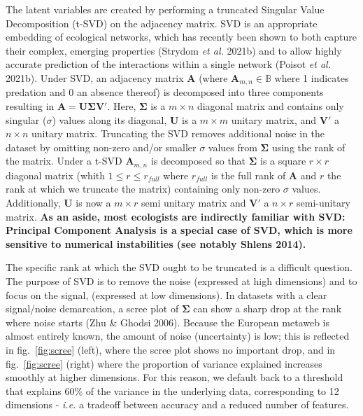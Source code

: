 \documentclass[11pt]{article}
\makeatletter
\def\maxwidth{\ifdim\Gin@nat@width>\linewidth\linewidth
\else\Gin@nat@width\fi}
\let\Oldincludegraphics\includegraphics
\renewcommand{\includegraphics}[1]{\Oldincludegraphics[width=\maxwidth]{#1}}
\providecommand{\DIFaddtex}[1]{{\bf #1}} %
\providecommand{\DIFdeltex}[1]{} %
\providecommand{\DIFaddbegin}{\protect\color{blue}} %
\providecommand{\DIFaddend}{\protect\color{black}} %
\providecommand{\DIFdelbegin}{\protect\color{red}} %
\providecommand{\DIFdelend}{\protect\color{black}} %
\providecommand{\DIFadd}[1]{\texorpdfstring{\DIFaddtex{#1}}{#1}} %
\providecommand{\DIFdel}[1]{\texorpdfstring{\DIFdeltex{#1}}{}} %
\newcommand{\DIFscaledelfig}{0.5}
\newlength{\DIFdelgraphicswidth} %
\newlength{\DIFdelgraphicsheight} %
\newcommand{\DIFaddincludegraphics}[2][]{{\color{blue}\fbox{\DIFOincludegraphics[#1]{#2}}}} %
\newcommand{\DIFdelincludegraphics}[2][]{%
\sbox{\DIFdelgraphicsbox}{\DIFOincludegraphics[#1]{#2}}%
\settoboxwidth{\DIFdelgraphicswidth}{\DIFdelgraphicsbox} %
\settoboxtotalheight{\DIFdelgraphicsheight}{\DIFdelgraphicsbox} %
\scalebox{\DIFscaledelfig}{%
\parbox[b]{\DIFdelgraphicswidth}{\usebox{\DIFdelgraphicsbox}\\[-\baselineskip] \rule{\DIFdelgraphicswidth}{0em}}\llap{\resizebox{\DIFdelgraphicswidth}{\DIFdelgraphicsheight}{%
\setlength{\unitlength}{\DIFdelgraphicswidth}%
\begin{picture}(1,1)%
\thicklines\linethickness{2pt} %
{\color[rgb]{1,0,0}\put(0,0){\framebox(1,1){}}}%
{\color[rgb]{1,0,0}\put(0,0){\line( 1,1){1}}}%
{\color[rgb]{1,0,0}\put(0,1){\line(1,-1){1}}}%
\end{picture}%
}\hspace*{3pt}}} %
} %
\DeclareRobustCommand{\DIFaddbegin}{\DIFOaddbegin \let\includegraphics\DIFaddincludegraphics} %
\DeclareRobustCommand{\DIFaddend}{\DIFOaddend \let\includegraphics\DIFOincludegraphics} %
\DeclareRobustCommand{\DIFdelbegin}{\DIFOdelbegin \let\includegraphics\DIFdelincludegraphics} %
\DeclareRobustCommand{\DIFdelend}{\DIFOaddend \let\includegraphics\DIFOincludegraphics} %
\makeatother
\begin{document}
The latent variables are created by performing a truncated Singular
Value Decomposition (t-SVD) on the adjacency matrix. SVD is an
appropriate embedding of ecological networks, which has recently been
shown to both capture their complex, emerging properties (Strydom
\emph{et al.} 2021b) and to allow highly accurate prediction of the
interactions within a single network (Poisot \emph{et al.} 2021b). Under
SVD, an adjacency matrix \(\mathbf{A}\) (where
\(\mathbf{A}_{m,n}\in\mathbb{B}\) where 1 indicates predation and 0 an
absence thereof) is decomposed into three components resulting in
\DIFdelbegin \DIFdel{\(\mathbf{A} = \mathbf{L}\mathbf{\Sigma}\mathbf{R'}.\) }\DIFdelend \DIFaddbegin \DIFadd{\(\mathbf{A} = \mathbf{U}\mathbf{\Sigma}\mathbf{V'}.\) }\DIFaddend Here,
\(\mathbf{\Sigma}\) is a \(m \times n\) diagonal matrix and contains
only singular (\(\sigma\)) values along its diagonal, \DIFdelbegin \DIFdel{\(\mathbf{L}\) }\DIFdelend \DIFaddbegin \DIFadd{\(\mathbf{U}\) }\DIFaddend is
a \(m \times m\) unitary matrix, and \DIFdelbegin \DIFdel{\(\mathbf{R}'\) }\DIFdelend \DIFaddbegin \DIFadd{\(\mathbf{V}'\) }\DIFaddend a \(n \times n\)
unitary matrix. Truncating the SVD removes additional noise in the
dataset by omitting non-zero and/or smaller \(\sigma\) values from
\(\mathbf{\Sigma}\) using the rank of the matrix. Under a t-SVD
\(\mathbf{A}_{m,n}\) is decomposed so that \(\mathbf{\Sigma}\) is a
square \(r \times r\) diagonal matrix (whith \(1 \le r \le r_{full}\)
where \(r_{full}\) is the full rank of \(\mathbf{A}\) and \(r\) the rank
at which we truncate the matrix) containing only non-zero \(\sigma\)
values. Additionally, \DIFdelbegin \DIFdel{\(\mathbf{L}\) }\DIFdelend \DIFaddbegin \DIFadd{\(\mathbf{U}\) }\DIFaddend is now a \(m \times r\) semi
unitary matrix and \DIFdelbegin \DIFdel{\(\mathbf{R}'\) }\DIFdelend \DIFaddbegin \DIFadd{\(\mathbf{V}'\) }\DIFaddend a \(n \times r\) semi-unitary matrix.
\DIFaddbegin \DIFadd{As an aside, most ecologists are indirectly familiar with SVD: Principal
Component Analysis is a special case of SVD, which is more sensitive to
numerical instabilities (see notably Shlens 2014).
}\DIFaddend 

The specific rank at which the SVD ought to be truncated is a difficult
question. The purpose of SVD is to remove the noise (expressed at high
dimensions) and to focus on the signal, (expressed at low dimensions).
In datasets with a clear signal/noise demarcation, a scree plot of
\(\mathbf{\Sigma}\) can show a sharp drop at the rank where noise starts
(Zhu \& Ghodsi 2006). Because the European metaweb is almost entirely
known, the amount of noise (uncertainty) is low; this is reflected in
fig.~\ref{fig:scree} (left), where the scree plot shows no important
drop, and in fig.~\ref{fig:scree} (right) where the proportion of
variance explained increases smoothly at higher dimensions. For this
reason, we default back to a threshold that explains 60\% of the
variance in the underlying data, corresponding to 12 dimensions -
\emph{i.e.} a tradeoff between accuracy and a reduced number of
features.
\end{document}
